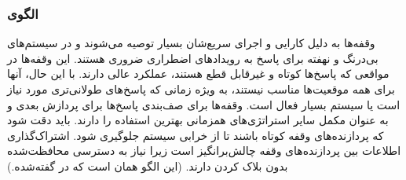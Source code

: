 \subsubsection{الگوی }
\label{archConInterruptSec}
\begin{RTL}
وقفه‌ها \cite{ref4} به دلیل کارایی و اجرای سریع‌شان بسیار
توصیه می‌شوند و در سیستم‌های بی‌درنگ
و نهفته برای پاسخ به رویدادهای اضطراری ضروری هستند.
این وقفه‌ها در مواقعی که پاسخ‌ها کوتاه و غیرقابل قطع هستند، عملکرد عالی دارند.
با این حال، آنها برای همه موقعیت‌ها مناسب نیستند، به ویژه زمانی که پاسخ‌های طولانی‌تری
مورد نیاز است یا سیستم بسیار فعال است. وقفه‌ها برای صف‌بندی پاسخ‌ها
برای پردازش بعدی و به عنوان مکمل سایر استراتژی‌های همزمانی بهترین استفاده
را دارند. باید دقت شود که پردازنده‌های وقفه کوتاه باشند تا از خرابی سیستم
جلوگیری شود. اشتراک‌گذاری اطلاعات بین پردازنده‌های وقفه چالش‌برانگیز
است زیرا نیاز به دسترسی محافظت‌شده بدون بلاک کردن دارند.
(این الگو همان  است که
در \cite{ref1} گفته‌شده.)
\end{RTL}